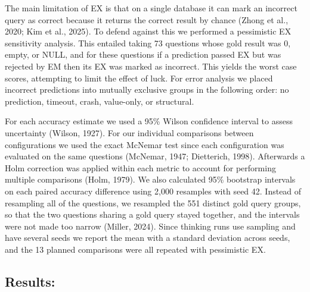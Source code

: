 The main limitation of EX is that on a single database it can mark an incorrect query as correct because it returns the correct result by chance (Zhong et al., 2020; Kim et al., 2025). To defend against this we performed a pessimistic EX sensitivity analysis. This entailed taking 73 questions whose gold result was 0, empty, or NULL, and for these questions if a prediction passed EX but was rejected by EM then its EX was marked as incorrect. This yields the worst case scores, attempting to limit the effect of luck. For error analysis we placed incorrect predictions into mutually exclusive groups in the following order: no prediction, timeout, crash, value-only, or structural.

For each accuracy estimate we used a 95\% Wilson confidence interval to assess uncertainty (Wilson, 1927). For our individual comparisons between configurations we used the exact McNemar test since each configuration was evaluated on the same questions (McNemar, 1947; Dietterich, 1998). Afterwards a Holm correction was applied within each metric to account for performing multiple comparisons (Holm, 1979). We also calculated 95\% bootstrap intervals on each paired accuracy difference using 2,000 resamples with seed 42. Instead of resampling all of the questions, we resampled the 551 distinct gold query groups, so that the two questions sharing a gold query stayed together, and the intervals were not made too narrow (Miller, 2024). Since thinking runs use sampling and have several seeds we report the mean with a standard deviation across seeds, and the 13 planned comparisons were all repeated with pessimistic EX.

\FloatBarrier
\subsection*{Results:}

